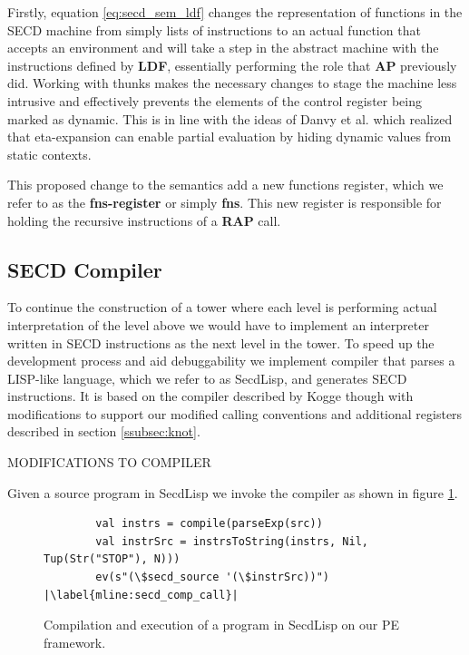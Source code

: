 \documentclass{article}
\theoremstyle{definition}
\newcommand{\secdlisp}{SecdLisp}
\begin{document}
Firstly, equation \ref{eq:secd_sem_ldf} changes the representation of functions in the SECD machine from simply lists of instructions to an actual function that accepts an environment and will take a step in the abstract machine with the instructions defined by \textbf{LDF}, essentially performing the role that \textbf{AP} previously did. Working with thunks makes the necessary changes to stage the machine less intrusive and effectively prevents the elements of the control register being marked as dynamic. This is in line with the ideas of Danvy et al. \cite{danvy1995essence} which realized that eta-expansion can enable partial evaluation by hiding dynamic values from static contexts.

This proposed change to the semantics add a new functions register, which we refer to as the \textbf{fns-register} or simply \textbf{fns}. This new register is responsible for holding the recursive instructions of a \textbf{RAP} call.


\subsection{SECD Compiler}
To continue the construction of a tower where each level is performing actual interpretation of the level above we would have to implement an interpreter written in SECD instructions as the next level in the tower. To speed up the development process and aid debuggability we implement compiler that parses a LISP-like language, which we refer to as \secdlisp{}, and generates SECD instructions. It is based on the compiler described by Kogge \cite{kogge1990architecture} though with modifications to support our modified calling conventions and additional registers described in section \ref{ssubsec:knot}.

MODIFICATIONS TO COMPILER

Given a source program in \secdlisp{} we invoke the compiler as shown in figure \ref{lst:secd_comp_ex1}.

\begin{figure}[ht]
\centering
\begin{verbatim}
        val instrs = compile(parseExp(src))
        val instrSrc = instrsToString(instrs, Nil, Tup(Str("STOP"), N)))
        ev(s"(\$secd_source '(\$instrSrc))") |\label{mline:secd_comp_call}|
\end{verbatim}
\caption{Compilation and execution of a program in \secdlisp{} on our PE framework.}
\label{lst:secd_comp_ex1}
\end{figure}
\end{document}
